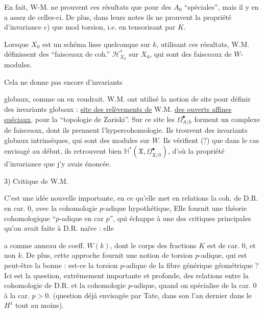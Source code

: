 En fait, W-M. ne prouvent ces résultats que pour des $A_0$ ``spéciales'', mais il y en a assez de celles-ci. De plus, dans leurs notes ils ne prouvent la propriété d'invariance c) que mod torsion, i.e. en tensorisant par $K$.

 Lorsque $X_0$ est un schéma lisse quelconque sur $k$, utilisant ces résultats, W.M. définissent  des ``faisceaux de coh.''  $\mathcal H^*_{X_0}$ sur $X_0$, qui sont des faisceaux de $W$-modules.

Cela ne donne pas encore d'invariants



globaux, comme on en voudrait.   W.M. ont utilisé la notion de  site pour définir des invariants globaux : \uline{site des relèvements de} W.M. \uline{des ouverts affines spéciaux}, pour la ``topologie de Zariski''. Sur ce site les $\Omega^\bullet_{A/k}$ forment un complexe de faisceaux, dont ils prennent l'hypercohomologie. Ils trouvent des invariants globaux intrinsèques, qui sont des modules sur $W$. Ils vérifient (?) que dans le cas envisagé au début, ils retrouvent bien $\mathbb H^*(\mathfrak X,\underline{\Omega}^\bullet_{\mathfrak X/S})$, d'où la propriété d'invariance que j'y avais énoncée.


3) Critique de W.M.

C'est une idée nouvelle importante, en ce qu'elle met en relations la coh. de D.R. en car. 0, avec la cohomologie $p$-adique hypothétique,  Elle fournit une théorie cohomologique ``$p$-adique en car $p$'', qui échappe à une des critiques principales qu'on avait faite à D.R. naïve : elle



a comme anneau de coeff. $W(k)$, dont le corps des fractions $K$ est de car. 0, et non $k$. De plus, cette approche    fournit  une notion de torsion $p$-adique,  qui est peut-être la bonne : est-ce la torsion $p$-adique de la fibre générique géométrique ? Ici est  la question, extrêmement importante et profonde, des relations entre la cohomologie de D.R. et la cohomologie $p$-adique, quand on spécialise de la car. 0 à la car. $p>0$. (question déjà envisagée par Tate,  dans son  l'an dernier dans le  $H^1$ tout au moins).

